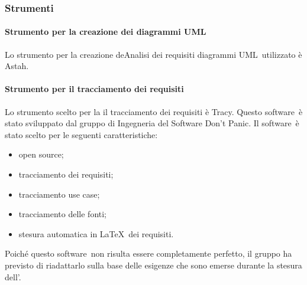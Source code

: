 \documentclass[../NormeProgetto.tex]{subfiles}
\begin{document}
		\subsubsection{Strumenti}
			\paragraph{Strumento per la creazione dei diagrammi UML}
			Lo strumento per la creazione deAnalisi dei requisiti diagrammi UML\g\ utilizzato è Astah\g.
			\paragraph{Strumento per il tracciamento dei requisiti}
			Lo strumento scelto per la il tracciamento dei requisiti è Tracy\g. Questo software\g\ è stato sviluppato dal gruppo di Ingegneria del Software Don't Panic. Il software\g\ è stato scelto per le seguenti caratteristiche:
			\begin{itemize}
				\item open source\g;
				\item tracciamento dei requisiti;
				\item tracciamento use case;
				\item tracciamento delle fonti;
				\item stesura automatica in \LaTeX\g\ dei requisiti.
			\end{itemize}
                        Poiché questo software\g\ non risulta essere completamente perfetto, il gruppo ha previsto di riadattarlo
 sulla base delle esigenze che sono emerse durante la stesura dell'\analisideirequisiti.
			
\end{document}
